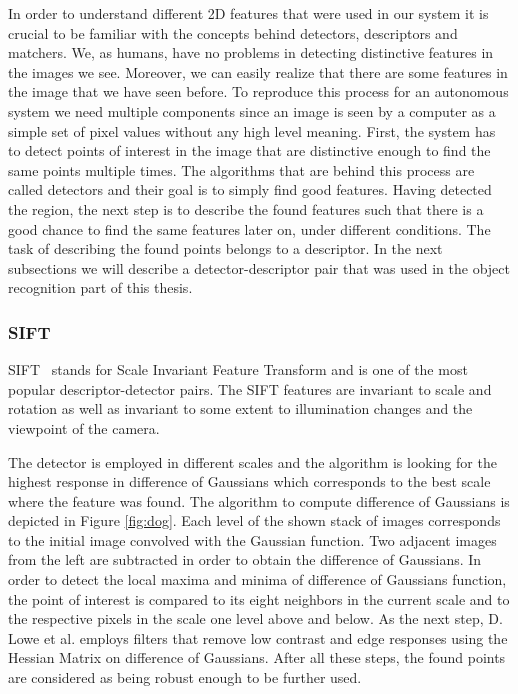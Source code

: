 In order to understand different 2D features that were used in our system it is crucial to be familiar with the concepts behind detectors, descriptors and matchers. We, as humans, have no problems in detecting distinctive features in the images we see. Moreover, we can easily realize that there are some features in the image that we have seen before. To reproduce this process for an autonomous system we need multiple components since an image is seen by a computer as a simple set of pixel values without any high level meaning. First, the system has to detect points of interest in the image that are distinctive enough to find the same points multiple times. The algorithms that are behind this process are called detectors and their goal is to simply find good features. Having detected the region, the next step is to describe the found features such that there is a good chance to find the same features later on, under different conditions. The task of describing the found points belongs to a descriptor. In the next subsections we will describe a detector-descriptor pair that was used in the object recognition part of this thesis.

\subsubsection{SIFT}
SIFT~\cite{lowe2004distinctive} stands for Scale Invariant Feature Transform and is one of the most popular descriptor-detector pairs. The SIFT features are invariant to scale and rotation as well as invariant to some extent to illumination changes and the viewpoint of the camera.  

The detector is employed in different scales and the algorithm is looking for the highest response in difference of Gaussians which corresponds to the best scale where the feature was found. The algorithm to compute difference of Gaussians is depicted in Figure \ref{fig:dog}. Each level of the shown stack of images corresponds to the initial image convolved with the Gaussian function. Two adjacent images from the left are subtracted in order to obtain the difference of Gaussians. In order to detect the local maxima and minima of difference of Gaussians function, the point of interest is compared to its eight neighbors in the current scale and to the respective pixels in the scale one level above and below. As the next step, D. Lowe et al. employs filters that remove low contrast and edge responses using the Hessian Matrix on difference of Gaussians. After all these steps, the found points are considered as being robust enough to be further used.

